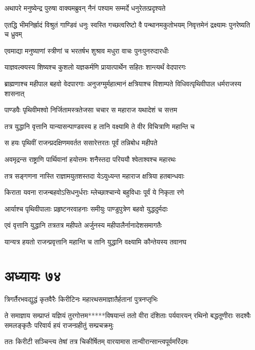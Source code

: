 \twolineshloka
{अथापरे मनुष्येन्द्र पुरुषा वाक्यमब्रुवन्}
{नैनं पश्याम सम्मर्दे धनुरेतत्प्रदृश्यते}


\threelineshloka
{एतद्धि भीमनिर्ह्रादं विश्रुतं गाण्डिवं धनुः}
{स्वस्ति गच्छत्वरिष्टो वै पन्थानमकुतोभयम्}
{निवृत्तमेनं द्रक्ष्यामः पुनरेष्यति च ध्रुवम्}


\twolineshloka
{एवमाद्या मनुष्याणां स्त्रीणां च भरतर्षभ}
{शुश्राव मधुरा वाचः पुनःपुनरुदारधीः}


\twolineshloka
{याज्ञवल्क्यस्य शिष्यश्च कुशलो यज्ञकर्मणि}
{प्रायात्पार्थेन सहितः शान्त्यर्थं वेदपारगः}


\threelineshloka
{ब्राह्मणाश्च महीपाल बहवो वेदपारगाः}
{अनुजग्मुर्महात्मानं क्षत्रियाश्च विशाम्पते}
{विधिवत्पृथिवीपाल धर्मराजस्य शासनात्}


\twolineshloka
{पाण्डवैः पृथिवीमश्वो निर्जितामस्त्रतेजसा}
{चचार स महाराज यथादेशं च सत्तम}


\twolineshloka
{तत्र युद्धानि वृत्तानि यान्यासन्पाण्डवस्य ह}
{तानि वक्ष्यामि ते वीर विचित्राणि महान्ति च}


\twolineshloka
{स हयः पृथिवीं राजन्प्रदक्षिणमवर्तत}
{ससारेत्तरतः पूर्वं तन्निबोध महीपते}


\twolineshloka
{अवमृद्रन्स राष्ट्राणि पार्थिवानां हयोत्तमः}
{शनैस्तदा परिययौ श्वेताश्वश्च महारथः}


\twolineshloka
{तत्र सङ्गणना नास्ति राज्ञामयुतशस्तदा}
{येऽयुध्यन्त महाराज क्षत्रिया हतबान्धवाः}


\twolineshloka
{किराता यवना राजन्बहवोऽसिधनुर्धराः}
{म्लेच्छाश्चान्ये बहुविधाः पूर्वं ये निकृता रणे}


\twolineshloka
{आर्याश्च पृथिवीपालाः प्रहृष्टनरवाहनाः}
{समीयुः पाण्डुपुत्रेण बहवो युद्धदुर्मदाः}


\twolineshloka
{एवं वृत्तानि युद्धानि तत्रतत्र महीपते}
{अर्जुनस्य महीपालैर्नानादेशसमागतैः}


\twolineshloka
{यान्यत्र हयतो राजन्प्रवृत्तानि महान्ति च}
{तानि युद्धानि वक्ष्यामि कौन्तेयस्य तवानघ}


\chapter{अध्यायः ७४}
\twolineshloka
{त्रिगर्तैरभवद्युद्धं कृतवैरैः किरीटिनः}
{महारथसमाज्ञातैर्हतानां पुत्रनप्तृभिः}


ते समाज्ञाय सम्प्राप्तं यज्ञियं तुरगोत्तम*****विषयान्तं ततो वीरा दंशिताः पर्यवारयन्
\twolineshloka
{रथिनो बद्धतूणीराः सदश्वैः समलङ्कृतैः}
{परिवार्य हयं राजन्ग्रहीतुं सम्प्रचक्रमुः}


\twolineshloka
{ततः किरीटी सञ्चिन्त्य तेषां तत्र चिकीर्षितम्}
{वारयामास तान्वीरान्सान्त्वपूर्वमरिंदमः}


